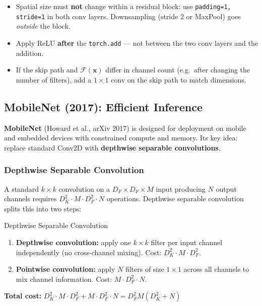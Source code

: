 \documentclass[11pt,a4paper]{article}
\newcommand{\term}[1]{\textcolor{DefGreen}{\textbf{#1}}}
\begin{document}
\begin{warnbox}
\begin{itemize}
  \item Spatial size must \textbf{not} change within a residual block: use \texttt{padding=1, stride=1} in both conv layers. Downsampling (stride 2 or MaxPool) goes \emph{outside} the block.
  \item Apply ReLU \textbf{after} the \texttt{torch.add} — not between the two conv layers and the addition.
  \item If the skip path and $\mathcal{F}(\mathbf{x})$ differ in channel count (e.g.\ after changing the number of filters), add a $1\times1$ conv on the skip path to match dimensions.
\end{itemize}
\end{warnbox}

\subsection{MobileNet (2017): Efficient Inference}
\label{sec:mobilenet}

\term{MobileNet} (Howard et al., arXiv 2017) is designed for deployment on mobile and embedded devices with constrained compute and memory. Its key idea: replace standard Conv2D with \term{depthwise separable convolutions}.

\subsubsection{Depthwise Separable Convolution}

A standard $k\times k$ convolution on a $D_F \times D_F \times M$ input producing $N$ output channels requires $D_K^2 \cdot M \cdot D_F^2 \cdot N$ operations. Depthwise separable convolution splits this into two steps:

\begin{defbox}{Depthwise Separable Convolution}
\begin{enumerate}
  \item \textbf{Depthwise convolution:} apply one $k\times k$ filter per input channel independently (no cross-channel mixing). Cost: $D_K^2 \cdot M \cdot D_F^2$.
  \item \textbf{Pointwise convolution:} apply $N$ filters of size $1\times1$ across all channels to mix channel information. Cost: $M \cdot D_F^2 \cdot N$.
\end{enumerate}
\textbf{Total cost:} $D_K^2 \cdot M \cdot D_F^2 + M \cdot D_F^2 \cdot N = D_F^2 M (D_K^2 + N)$
\end{defbox}
\end{document}
